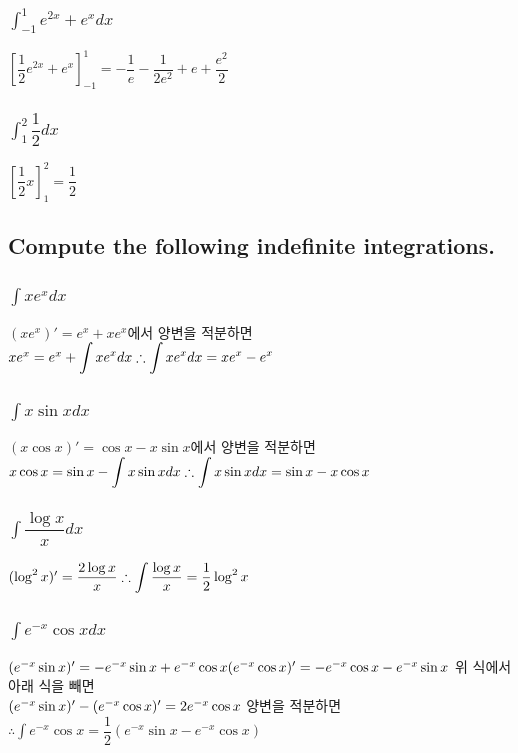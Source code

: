 \documentclass[12pt,a4paper]{article}
\begin{document}
\subsubsection{$\displaystyle\int_{-1}^1 e^{2x}+e^x dx$}
$\left[ \dfrac{1}{2}e^{2x}+e^x \right]_{-1}^1=- \dfrac{1}{e} - \dfrac{1}{2 e^{2}} + e + \dfrac{e^{2}}{2}$
\subsubsection{$\displaystyle\int_1^2 \dfrac{1}{2} dx$}
$\left[ \dfrac{1}{2} x \right]_1^2=\dfrac{1}{2}$
\subsection{Compute the following indefinite integrations.} 
\subsubsection{$\displaystyle\int  xe^x dx$}
$(xe^x)'=e^x + xe^x$에서 양변을 적분하면
$xe^x = e^x + \displaystyle\int xe^x dx\\
\therefore \displaystyle\int xe^x dx = xe^x - e^x$
\subsubsection{$\displaystyle\int x\sin x dx$}
$(x\cos x)' = \cos x - x\sin x$에서 양변을 적분하면
$x\cos x = \sin x - \displaystyle\int x\sin x dx\\
\therefore \displaystyle\int x\sin x dx = \sin x - x\cos x$
\subsubsection{$\displaystyle\int \dfrac{\log x}{x} dx$}
$(\log^2 x)' = \dfrac{2 \log x}{x}\\ 
\therefore \displaystyle\int \dfrac{\log x}{x}= \dfrac{1}{2} \log^2 x $
\subsubsection{$\displaystyle\int  e^{-x}\cos x dx$}
$(e^{-x}\sin x)' = -e^{-x}\sin x + e^{-x}\cos x\\
(e^{-x}\cos x)'= -e^{-x}\cos x -e^{-x}\sin x\\$
위 식에서 아래 식을 빼면 \\
$(e^{-x}\sin x)'- (e^{-x}\cos x)' = 2e^{-x}\cos x\\$
양변을 적분하면 
$\therefore \displaystyle\int e^{-x}\cos x = \dfrac{1}{2}(e^{-x}\sin x -e^{-x}\cos x)$
\end{document}
